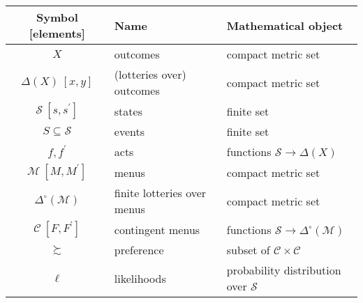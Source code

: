 \begin{table}[H]
	\centering
	\begin{tabular}{ c l l }
		\hline
		\textbf{Symbol [elements]}                         & \textbf{Name}               & \textbf{Mathematical object}                                                                  \\ \hline
		\( X \)                                            & outcomes                    & compact metric set                                                                            \\ \hline
		\(\Delta \left( X \right) \ \left[ x, y \right] \) & (lotteries over) outcomes   & compact metric set                                                                            \\ \hline
		\( \mathcal{S} \ \left[ s, s^{\prime} \right] \)   & states                      & finite set                                                                                    \\ \hline
		\( S \subseteq \mathcal{S} \)                      & events                      & finite set                                                                                    \\ \hline
		\( f, f^{\prime} \)                                & acts                        & functions \( \mathcal{S} \rightarrow \Delta \left( X \right) \)                               \\ \hline
		\( \mathcal{M} \ \left[ M, M^{\prime} \right] \)   & menus                       & compact metric set                                                                            \\ \hline
		\(\Delta^{\circ} \left( \mathcal{M} \right) \)     & finite lotteries over menus & compact metric set                                                                            \\ \hline
		\( \mathcal{C} \ \left[ F, F^{\prime} \right] \)   & contingent menus            & functions  \( \mathcal{S} \rightarrow \Delta^{\circ} \left( \mathcal{M} \right) \)            \\ \hline
		\( \succsim \)                                     & preference                  & subset of \( \mathcal{C} \times \mathcal{C} \)                                                \\ \hline
		\( \ell \)                                         & likelihoods                 & probability distribution over \( \mathcal{S} \)                                               \\ \hline

\end{tabular}
\end{table}

